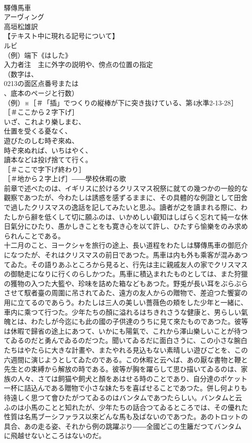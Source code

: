\documentclass[8pt]{extreport}
\begin{document}
\begin{CJK}{UTF8}{min}
\\	驛傳馬車
\\	アーヴィング
\\	高垣松雄訳
\\	【テキスト中に現れる記号について】
\\	ルビ
\\	（例）端下《はした》
\\	入力者注　主に外字の説明や、傍点の位置の指定
\\	（数字は、
\\	0213の面区点番号または
\\	、底本のページと行数）
\\	（例）※［＃「插」でつくりの縦棒が下に突き抜けている、第4水準2-13-28］
\\	［＃ここから２字下げ］
\\	いざ、これより樂しまむ、
\\	仕置を受くる憂なく、
\\	遊びたのしむ時ぞ來ぬ、
\\	時ぞ來ぬれば、いちはやく、
\\	讀本などは投げ捨てて行く。
\\	［＃ここで字下げ終わり］
\\	［＃地から２字上げ］――學校休暇の歌
\\	前章で述べたのは、イギリスに於けるクリスマス祝祭に就ての幾つかの一般的な觀察であつたが、今わたしは誘惑を感ずるままに、その具體的な例證として田舍で過したクリスマスの逸話を記してみたいと思ふ。讀者が之を讀まれる際に、わたしから辭を低くして切に願ふのは、いかめしい叡知はしばらく忘れて純一な休日氣分にひたり、愚かしきことをも寛き心を以て許し、ひたすら愉樂をのみ求められんことである。
\\	十二月のこと、ヨークシャを旅行の途上、長い道程をわたしは驛傳馬車の御厄介になつたが、それはクリスマスの前日であつた。馬車は内も外も乘客が混みあつてゐた。その語りあふところから見ると、行先は主に親戚友人の家でクリスマスの御馳走になりに行くのらしかつた。馬車に積込まれたものとしては、また狩獵の獲物の入つた大籃や、珍味を詰めた箱などもあつた。野兎が長い耳をぶらぶらさせて馭者臺の周圍に吊されてゐた、遠方の友人からの贈物で、差迫つた饗宴の用に立てるのであらう。わたしは三人の美しい薔薇色の頬をした少年と一緒に、車内に乘つて行つた。少年たちの顏に溢れるはちきれさうな健康と、男らしい氣魄とは、わたしが今迄にも此の國の子供達のうちに見て來たものであつた。彼等は休暇で歸省の途上にあつて、いかにも陽氣で、これから澤山樂しいことが待つてゐるのだと勇んでゐるのだつた。聞いてゐるだに面白さうに、この小さな腕白たちはやたらに大きな計畫や、またやれる見込もない素晴しい遊びごとを、この六週間に演じようとしてゐたのである。この休暇と云へば、あの厭な書物と鞭と先生との束縛から解放の時である。彼等が胸を躍らして思ひ描いてゐるのは、家族の人々、さては飼猫や飼犬と顏をあはせる時のことであり、自分達のポケット一杯に詰込んである贈物で小さな妹たちを喜ばせることであつた。併し何よりも待遠しく思つて會ひたがつてゐるのはバンタムであつたらしい。バンタムと云ふのは小馬のことと知れたが、少年たちの話合つてゐるところでは、その優れた性質は名馬ブーシファラス以來どんな馬も及ばないのであつた。あのトロットの具合、あの走る姿、それから例の跳躍ぶり――全國どこの生籬だつてバンタムに飛越せないところはないのだ。

\end{CJK}
\end{document}
